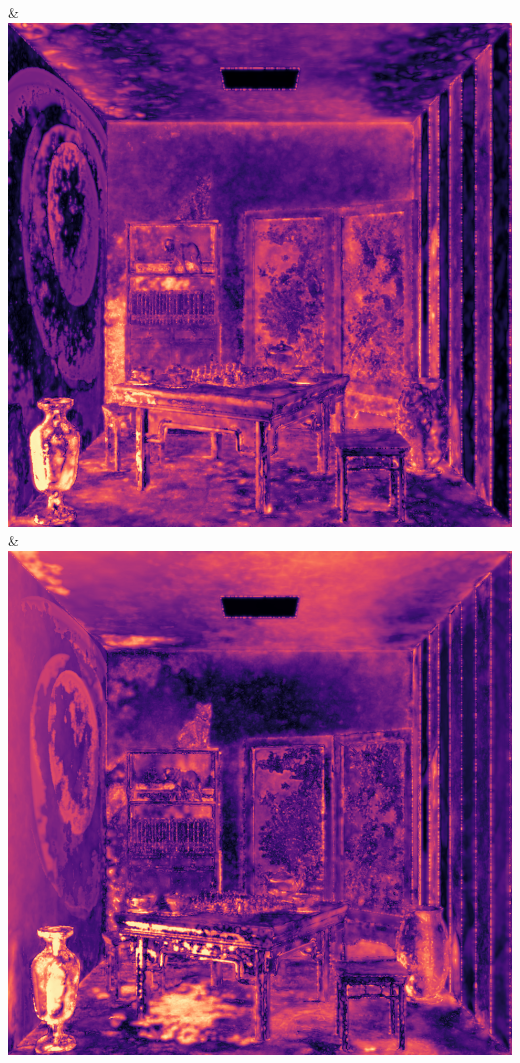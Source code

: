 & \includegraphics[width=\linewidth]{figures/py/tests/quality_comparison/nrc+pt_1spp_chess_flip.png}
& \includegraphics[width=\linewidth]{figures/py/tests/quality_comparison/nrc+pt+sl_1spp_chess_flip.png}
